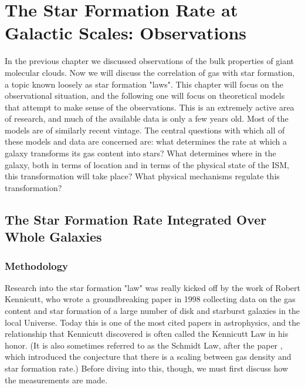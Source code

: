\chapter{The Star Formation Rate at Galactic Scales: Observations}
\label{ch:sflaw_obs}


In the previous chapter we discussed observations of the bulk properties of giant molecular clouds. Now we will discuss the correlation of gas with star formation, a topic known loosely as star formation "laws". This chapter will focus on the observational situation, and the following one will focus on theoretical models that attempt to make sense of the observations. This is an extremely active area of research, and much of the available data is only a few years old. Most of the models are of similarly recent vintage. The central questions with which all of these models and data are concerned are: what determines the rate at which a galaxy transforms its gas content into stars? What determines where in the galaxy, both in terms of location and in terms of the physical state of the ISM, this transformation will take place? What physical mechanisms regulate this transformation? 

\section{The Star Formation Rate Integrated Over Whole Galaxies}

\subsection{Methodology}

Research into the star formation "law" was really kicked off by the work of Robert Kennicutt, who wrote a groundbreaking paper in 1998 \citep{kennicutt98a} collecting data on the gas content and star formation of a large number of disk and starburst galaxies in the local Universe. Today this is one of the most cited papers in astrophysics, and the relationship that Kennicutt discovered is often called the Kennicutt Law in his honor. (It is also sometimes referred to as the Schmidt Law, after the paper \citet{schmidt59a}, which introduced the conjecture that there is a scaling between gas density and star formation rate.) Before diving into this, though, we must first discuss how the measurements are made.

